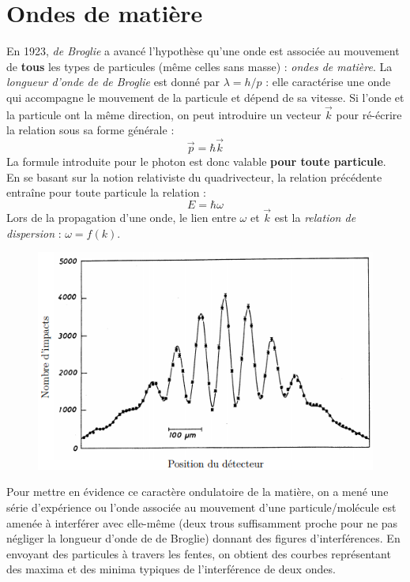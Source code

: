 \documentclass[british,french,11pt, a4paper, openany]{book}
\begin{document}
	\section{Ondes de matière}
	En 1923, \textit{de Broglie} a avancé l'hypothèse qu'une onde est associée au mouvement de \textbf{tous} les types de particules (même celles sans masse) : \textit{ondes de matière}. La \textit{longueur d'onde de de Broglie} est donné par $\lambda = h/p$ : elle caractérise une onde qui accompagne le mouvement de la particule et dépend de sa vitesse. Si l'onde et la particule ont la même direction, on peut introduire un vecteur $\vec{k}$ pour ré-écrire la relation sous sa forme générale :
	\begin{equation}
		\vec p = \hbar \vec{k}
	\end{equation}
	La formule introduite pour le photon est donc valable \textbf{pour toute particule}.\\
	En se basant sur la notion relativiste du quadrivecteur, la relation précédente entraîne pour toute particule la relation :
	\begin{equation}
		E = \hbar\omega
	\end{equation}
	Lors de la propagation d'une onde, le lien entre $\omega$ et $\vec{k}$ est la \textit{relation de dispersion} : $\omega = f(k)$.\\
	
	\begin{figure}
		\includegraphics[scale=0.3]{img/image3.png}
	\end{figure}
	Pour mettre en évidence ce caractère ondulatoire de la matière, on a mené une série d'expérience ou l'onde associée au mouvement d'une particule/molécule est amenée à interférer avec elle-même (deux trous suffisamment proche pour ne pas négliger la longueur d'onde de de Broglie) donnant des figures d'interférences. En envoyant des particules à travers les fentes, on obtient des courbes représentant des maxima et des minima typiques de l’interférence de deux ondes.\\
	
\end{document}
